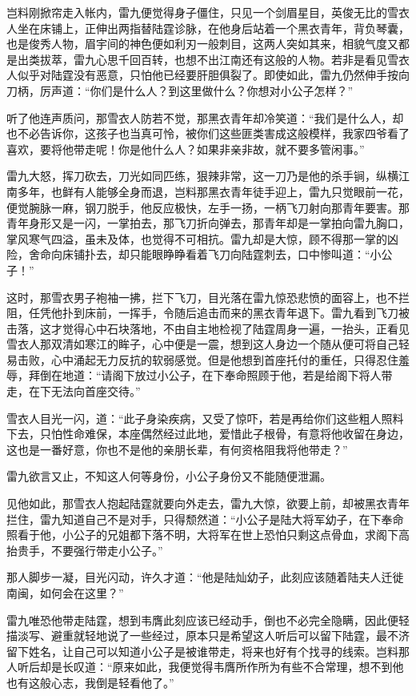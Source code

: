 岂料刚掀帘走入帐内，雷九便觉得身子僵住，只见一个剑眉星目，英俊无比的雪衣人坐在床铺上，正伸出两指替陆霆诊脉，在他身后站着一个黑衣青年，背负琴囊，也是俊秀人物，眉宇间的神色便如利刃一般刺目，这两人突如其来，相貌气度又都是出类拔萃，雷九心思千回百转，也想不出江南还有这般的人物。若非是看见雪衣人似乎对陆霆没有恶意，只怕他已经要肝胆俱裂了。即使如此，雷九仍然伸手按向刀柄，厉声道：“你们是什么人？到这里做什么？你想对小公子怎样？”

听了他连声质问，那雪衣人防若不觉，那黑衣青年却冷笑道：“我们是什么人，却也不必告诉你，这孩子也当真可怜，被你们这些匪类害成这般模样，我家四爷看了喜欢，要将他带走呢！你是他什么人？如果非亲非故，就不要多管闲事。”

雷九大怒，挥刀砍去，刀光如同匹练，狠辣非常，这一刀乃是他的杀手锏，纵横江南多年，也鲜有人能够全身而退，岂料那黑衣青年徒手迎上，雷九只觉眼前一花，便觉腕脉一麻，钢刀脱手，他反应极快，左手一扬，一柄飞刀射向那青年要害。那青年身形又是一闪，一掌拍去，那飞刀折向弹去，那青年却是一掌拍向雷九胸口，掌风寒气四溢，虽未及体，也觉得不可相抗。雷九却是大惊，顾不得那一掌的凶险，舍命向床铺扑去，却只能眼睁睁看着飞刀向陆霆刺去，口中惨叫道：“小公子！”

这时，那雪衣男子袍袖一拂，拦下飞刀，目光落在雷九惊恐悲愤的面容上，也不拦阻，任凭他扑到床前，一挥手，令随后追击而来的黑衣青年退下。雷九看到飞刀被击落，这才觉得心中石块落地，不由自主地检视了陆霆周身一遍，一抬头，正看见雪衣人那双清如寒江的眸子，心中便是一震，想到这人身边一个随从便可将自己轻易击败，心中涌起无力反抗的软弱感觉。但是他想到首座托付的重任，只得忍住羞辱，拜倒在地道：“请阁下放过小公子，在下奉命照顾于他，若是给阁下将人带走，在下无法向首座交待。”

雪衣人目光一闪，道：“此子身染疾病，又受了惊吓，若是再给你们这些粗人照料下去，只怕性命难保，本座偶然经过此地，爱惜此子根骨，有意将他收留在身边，这也是一番好意，你也不是他的亲朋长辈，有何资格阻我将他带走？”

雷九欲言又止，不知这人何等身份，小公子身份又不能随便泄漏。

见他如此，那雪衣人抱起陆霆就要向外走去，雷九大惊，欲要上前，却被黑衣青年拦住，雷九知道自己不是对手，只得颓然道：“小公子是陆大将军幼子，在下奉命照看于他，小公子的兄姐都下落不明，大将军在世上恐怕只剩这点骨血，求阁下高抬贵手，不要强行带走小公子。”

那人脚步一凝，目光闪动，许久才道：“他是陆灿幼子，此刻应该随着陆夫人迁徙南闽，如何会在这里？”

雷九唯恐他带走陆霆，想到韦膺此刻应该已经动手，倒也不必完全隐瞒，因此便轻描淡写、避重就轻地说了一些经过，原本只是希望这人听后可以留下陆霆，最不济留下姓名，让自己可以知道小公子是被谁带走，将来也好有个找寻的线索。岂料那人听后却是长叹道：“原来如此，我便觉得韦膺所作所为有些不合常理，想不到他也有这般心志，我倒是轻看他了。”

